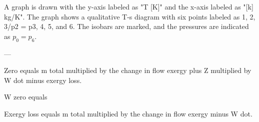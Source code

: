 A graph is drawn with the y-axis labeled as "T [K]" and the x-axis labeled as "[k] kg/K". The graph shows a qualitative T-s diagram with six points labeled as 1, 2, 3/p2 = p3, 4, 5, and 6. The isobars are marked, and the pressures are indicated as \( p_0 = p_6 \).

---

Zero equals m total multiplied by the change in flow exergy plus Z multiplied by W dot minus exergy loss.  

W zero equals  

Exergy loss equals m total multiplied by the change in flow exergy minus W dot.